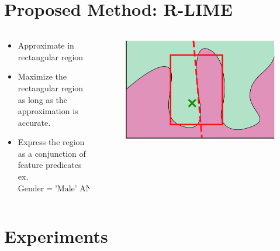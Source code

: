 \documentclass[aspectratio=169]{slide-en}
\begin{document}
\section{Proposed Method: R-LIME}

\begin{frame}{}
  \begin{columns}[]
    \begin{column}{0.55\textwidth}

      \bigskip
      \begin{itemize}
        \item Approximate in rectangular region
        \item Maximize the rectangular region as long as
              the approximation is accurate.
        \item Express the region as a conjunction of feature predicates \\
              \smallskip
              \footnotesize{
                ex. $\textrm{Gender} = \textrm{'Male' AND } 20\le\textrm{Age} < 30$
              }
      \end{itemize}
    \end{column}
    \begin{column}{0.40\textwidth}
      \begin{figure}
        \includegraphics[width=\textwidth]{visual-rlime3}
      \end{figure}
    \end{column}
  \end{columns}
\end{frame}

\section{Experiments}
\end{document}
